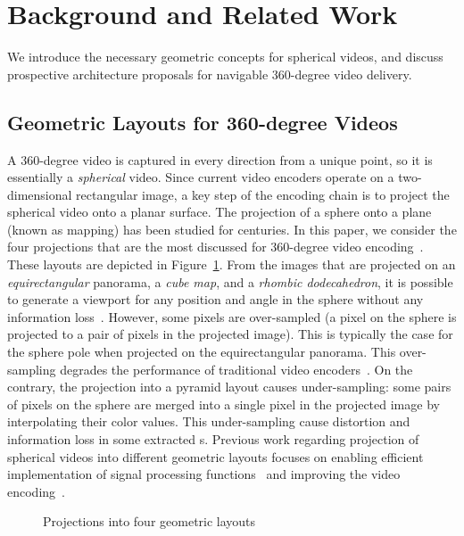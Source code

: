 \section{Background and Related Work}
\label{sec:related}

We introduce the necessary geometric concepts for spherical
videos, and discuss prospective architecture
proposals for navigable $360$-degree video delivery.

\subsection{Geometric Layouts for 360-degree Videos}

A $360$-degree video is captured in every direction from a unique point,
so it is essentially a \emph{spherical} video. Since current video encoders
operate on a two-dimensional rectangular image, a key step of the
encoding chain is to project the spherical video onto a planar
surface. The projection of a sphere onto a plane (known as mapping)
has been studied for centuries. In this paper, we consider the four
projections that are the most discussed for $360$-degree video
encoding~\cite{yu_framework_2015}. These layouts are depicted in
Figure~\ref{fig:mapping}.
From the images that are projected on an \textit{equirectangular}
panorama, a \textit{cube map}, and a \textit{rhombic dodecahedron}, it
is possible to generate a viewport for any position and angle in the
sphere without any information loss~\cite{Ng2005, fu_rhombic_2009}.
However, some pixels are over-sampled (a pixel on the sphere is
projected to a pair of pixels in the projected image). This is
typically the case for the sphere pole when projected on the
equirectangular panorama. This over-sampling degrades the performance
of traditional video encoders~\cite{wojciechowski_h.264_2006,
yu_framework_2015}. On the contrary, the projection into a pyramid
layout causes under-sampling: some pairs of pixels on the sphere
are merged into a
single pixel in the projected image by interpolating their color
values. This under-sampling cause distortion and information loss in
some extracted \FoV{}s. Previous work regarding projection of spherical
videos into different geometric layouts focuses on enabling efficient
implementation of signal processing
functions~\cite{kazhdan_metric-aware_2010} and improving the video
encoding~\cite{tosic_low_2009}.


\begin{figure}[t]
\centering

\caption{Projections into four geometric layouts}\label{fig:mapping}
\end{figure}

